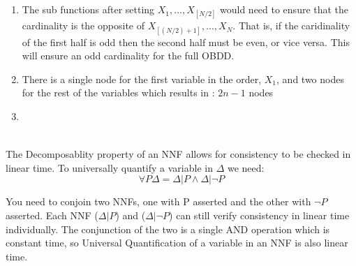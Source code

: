 \documentclass{article}
\begin{document}
\section{}
\begin{enumerate}
    \item The sub functions after setting $X_1, ..., X_{[N/2]}$ would need to ensure that the cardinality is the opposite of $X_{[(N/2) + 1]}, ..., X_N$.  That is, if the caridinality of the first half is odd then the second half must be even, or vice versa.  This will ensure an odd cardinality for the full OBDD.
    \item There is a single node for the first variable in the order, $X_1$, and two nodes for the rest of the variables which results in : $2n - 1$ nodes
    \item \[\]
    \begin{center}
    \end{center}
\end{enumerate}
\clearpage
\section{}
The Decomposablity property of an NNF allows for consistency to be checked in linear time. To universally quantify a variable in $\Delta$ we need:
\[
\forall P\Delta = \Delta|P \land \Delta|\lnot P
\]

You need to conjoin two NNFs, one with P asserted and the other with $\lnot P$ asserted.  Each NNF ($\Delta|P$) and ($\Delta|\lnot P$) can still verify consistency in linear time individually.  The conjunction of the two is a single AND operation which is constant time, so Universal Quantification of a variable in an NNF is also linear time.
\end{document}
